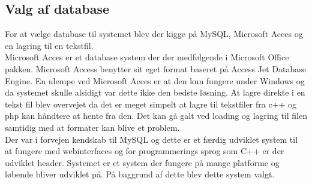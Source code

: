 \subsection{Valg af database}
For at vælge database til systemet blev der kigge på MySQL, Microsoft Acces og en lagring til en tekstfil.\\
Microsoft Acces er et database system der der medfølgende i Microsoft Office pakken. Microsoft Access benytter sit eget format baseret på Access Jet Database Engine. En ulempe ved Microsoft Acces er at den kun fungere under Windows og da systemet skulle alsidigt var dette ikke den bedste løsning. At lagre direkte i en tekst fil blev overvejet da det er meget simpelt at lagre til tekstfiler fra c++ og php kan håndtere at hente fra den. Det kan gå galt ved loading og lagring til filen samtidig med at formater kan blive et problem. \\
Der var i forvejen kendskab til MySQL og dette er et færdig udviklet system til at fungere med webinterfaces og for programmerings sprog som C++ er der udviklet header. Systemet er et system der fungere på mange platforme og løbende bliver udviklet på. På baggrund af dette blev dette system valgt.

